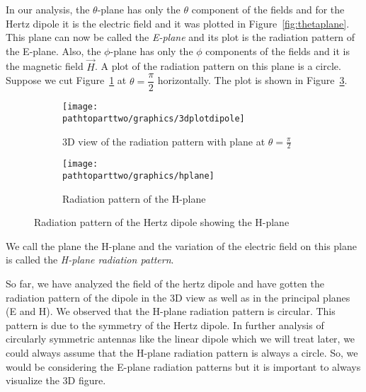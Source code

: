 In our analysis, the $\theta$-plane has only the $\theta$ component of the fields and for the Hertz dipole it is the electric field and it was plotted in Figure~\ref{fig:thetaplane}. This plane can now be called the \emph{E-plane} and its plot is the radiation pattern of the E-plane. Also, the $\phi$-plane has only the $\phi$ components of the fields and it is the magnetic field $\vec{H}$. A plot of the radiation pattern on this plane is a circle. Suppose we cut Figure~\ref{fig:3dplotdipole} at $\theta=\dfrac{\pi}{2}$ horizontally. The plot is shown in Figure~\ref{fig:phiplane}.
\begin{figure}[h]
\centering
\begin{subfigure}[a]{1\linewidth}
\texttt{[image: \\pathtoparttwo/graphics/3dplotdipole]}
\caption{3D view of the radiation pattern with plane at $\theta=\frac{\pi}{2}$}
\label{fig:3dplotdipole}
\end{subfigure}
\begin{subfigure}[b]{1\linewidth}
\texttt{[image: \\pathtoparttwo/graphics/hplane]}
\caption{Radiation pattern of the H-plane}
\label{fig:phiplane}
\end{subfigure}
\caption{Radiation pattern of the Hertz dipole showing the H-plane}
\end{figure}

We call the plane the H-plane and the variation of the electric field on this plane is called the \emph{H-plane radiation pattern}.

So far, we have analyzed the field of the hertz dipole and have gotten the radiation pattern of the dipole in the 3D view as well as in the principal planes (E and H). We observed that the H-plane radiation pattern is circular. This pattern is due to the symmetry of the Hertz dipole. In further analysis of circularly symmetric antennas like the linear dipole which we will treat later, we could always assume that the H-plane radiation pattern is always a circle. So, we would be considering the E-plane radiation patterns but it is important to always visualize the 3D figure.


